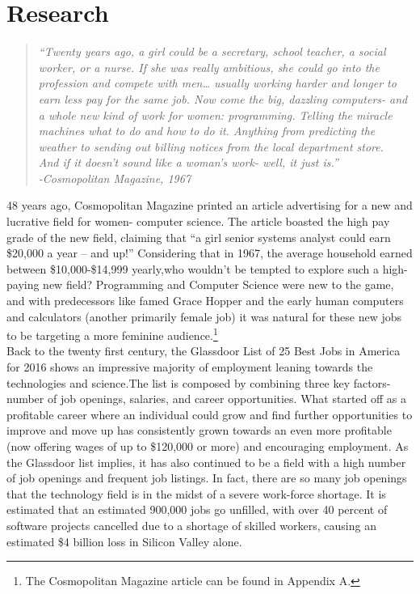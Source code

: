 \documentclass[12pt]{article}
\begin{document}
    \section{Research}
	
	\begin{quotation}
		\begin{center}
			\singlespacing
			\textit{“Twenty years ago, a girl could be a secretary, school teacher, a social worker, or a nurse. If she was really ambitious, she could go into the profession and compete with men… usually working harder and longer to earn less pay for the same job. Now come the big, dazzling computers- and a whole new kind of work for women: programming. Telling the miracle machines what to do and how to do it. Anything from predicting the weather to sending out billing notices from the local department store. \\
				And if it doesn’t sound like a woman’s work- well, it just is.” \\
				-Cosmopolitan Magazine, 1967 }\cite{cosmo}
		\end{center}	
	\end{quotation}

	48 years ago, Cosmopolitan Magazine printed an article advertising for a new and lucrative field for women- computer science. The article boasted the high pay grade of the new field, claiming that “a girl senior systems analyst could earn \$20,000 a year – and up!” Considering that in 1967, the average household earned between \$10,000-\$14,999 yearly\cite{income1969},who wouldn’t be tempted to explore such a high-paying new field? Programming and Computer Science were new to the game, and with predecessors like famed Grace Hopper and the early human computers and calculators (another primarily female job) it was natural for these new jobs to be targeting a more feminine audience.\footnote{The Cosmopolitan Magazine article can be found in Appendix A.} \\
	
	Back to the twenty first century, the Glassdoor List of 25 Best Jobs in America for 2016 shows an impressive majority of employment leaning towards the technologies and science\cite{glassdoor}.The list is composed by combining three key factors- number of job openings, salaries, and career opportunities. What started off as a profitable career where an individual could grow and find further opportunities to improve and move up has consistently grown towards an even more profitable (now offering wages of up to \$120,000 or more) and encouraging employment. As the Glassdoor list implies, it has also continued to be a field with a high number of job openings and frequent job listings. In fact, there are so many job openings that the technology field is in the midst of a severe work-force shortage. It is estimated that an estimated 900,000 jobs go unfilled, with over 40 percent of software projects cancelled due to a shortage of skilled workers, causing an estimated \$4 billion loss in Silicon Valley alone\cite{margolis}.\\
	
\end{document}
